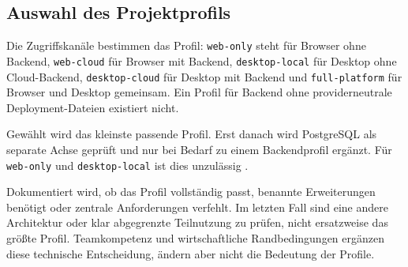 \subsection{Auswahl des Projektprofils}
\label{subsec:auswahl-projektprofil}

Die Zugriffskanäle bestimmen das Profil: \texttt{web-only} steht für Browser
ohne Backend, \texttt{web-cloud} für Browser mit Backend,
\texttt{desktop-local} für Desktop ohne Cloud-Backend,
\texttt{desktop-cloud} für Desktop mit Backend und \texttt{full-platform} für
Browser und Desktop gemeinsam. Ein Profil für Backend ohne providerneutrale
Deployment-Dateien existiert nicht.

Gewählt wird das kleinste passende Profil. Erst danach wird PostgreSQL als
separate Achse geprüft und nur bei Bedarf zu einem Backendprofil ergänzt. Für
\texttt{web-only} und \texttt{desktop-local} ist dies unzulässig
\parencite{kleiveist2026profiles}.

Dokumentiert wird, ob das Profil vollständig passt, benannte Erweiterungen
benötigt oder zentrale Anforderungen verfehlt. Im letzten Fall sind eine
andere Architektur oder klar abgegrenzte Teilnutzung zu prüfen, nicht
ersatzweise das größte Profil.
Teamkompetenz und wirtschaftliche Randbedingungen ergänzen diese technische
Entscheidung, ändern aber nicht die Bedeutung der Profile.
